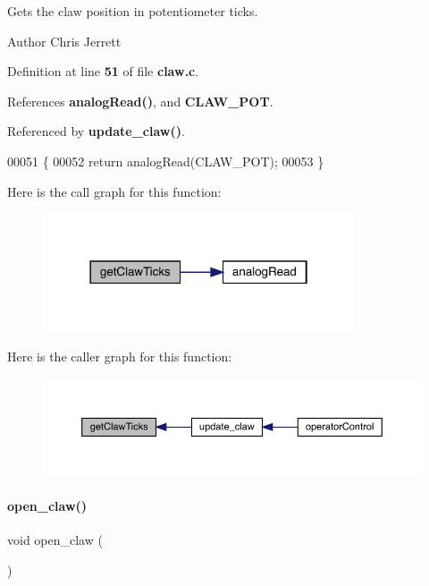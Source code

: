 Gets the claw position in potentiometer ticks. 

\begin{DoxyAuthor}{Author}
Chris Jerrett 
\end{DoxyAuthor}


Definition at line \textbf{ 51} of file \textbf{ claw.\+c}.



References \textbf{ analog\+Read()}, and \textbf{ C\+L\+A\+W\+\_\+\+P\+OT}.



Referenced by \textbf{ update\+\_\+claw()}.


\begin{DoxyCode}
00051                            \{
00052   \textcolor{keywordflow}{return} analogRead(CLAW_POT);
00053 \}
\end{DoxyCode}
Here is the call graph for this function\+:\nopagebreak
\begin{figure}[H]
\begin{center}
\leavevmode
\includegraphics[width=261pt]{claw_8h_addd2004effae7c94400aed1fe6a90ead_cgraph}
\end{center}
\end{figure}
Here is the caller graph for this function\+:\nopagebreak
\begin{figure}[H]
\begin{center}
\leavevmode
\includegraphics[width=350pt]{claw_8h_addd2004effae7c94400aed1fe6a90ead_icgraph}
\end{center}
\end{figure}
\mbox{\label{claw_8h_a03023ca28f671b9fa7bac07782ccd8c1}} 
\paragraph{open\+\_\+claw()}
{\footnotesize\ttfamily void open\+\_\+claw (\begin{DoxyParamCaption}{ }\end{DoxyParamCaption})}




